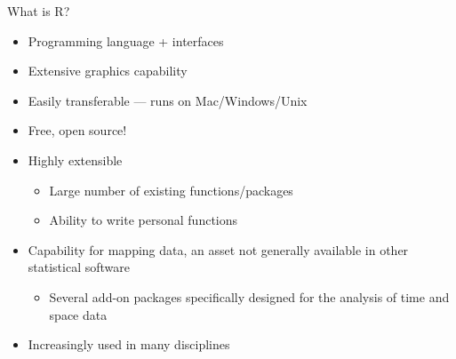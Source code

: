 \documentclass[aspectratio=169]{beamer}\usepackage[]{graphicx}\usepackage[]{color}
\begin{document}
\begin{frame}{What is R?}
\begin{itemize}
	\item Programming language + interfaces
	\item Extensive graphics capability
	\item Easily transferable --- runs on Mac/Windows/Unix
	\item Free, open source!
	\item Highly extensible
	\begin{itemize}
		\item Large number of existing functions/packages
		\item Ability to write personal functions
	\end{itemize}
	\item Capability for mapping data, an asset not generally available in other statistical software
	\begin{itemize}
  	\item Several add-on packages specifically designed for the analysis of time and space data
	\end{itemize}
	\item Increasingly used in many disciplines
\end{itemize}
\end{frame}
\end{document}
